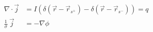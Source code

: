 \begin{equation}
\begin{aligned}
\nabla\cdot \vec{j} & = I(\delta(\vec{r}-\vec{r}_{s^+}) - \delta(\vec{r}-\vec{r}_{s^-})) = q\\
\frac{1}{\sigma}~\vec{j} &=  - \nabla \phi
\end{aligned}
\label{eq:dc-resistivity}
\end{equation}
